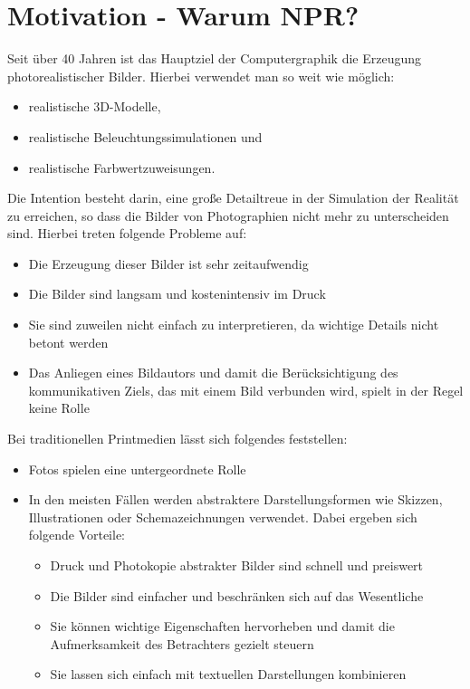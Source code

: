 \section{Motivation - Warum NPR?}
Seit über 40 Jahren ist das Hauptziel der Computergraphik die Erzeugung 
photorealistischer Bilder. Hierbei verwendet man so weit wie möglich:
\begin{itemize}
  \item realistische 3D-Modelle,
  \item realistische Beleuchtungssimulationen und
  \item realistische Farbwertzuweisungen.
\end{itemize}
Die Intention besteht darin, eine große Detailtreue in der Simulation der 
Realität zu erreichen, so dass die Bilder von Photographien nicht mehr zu 
unterscheiden sind. Hierbei treten folgende Probleme auf:
\begin{itemize}
  \item Die Erzeugung dieser Bilder ist sehr zeitaufwendig
  \item Die Bilder sind langsam und kostenintensiv im Druck
  \item Sie sind zuweilen nicht einfach zu interpretieren, da wichtige Details 
  nicht betont werden
  \item Das Anliegen eines Bildautors und damit die Berücksichtigung des 
  kommunikativen Ziels, das mit einem Bild verbunden wird, spielt in der Regel 
  keine Rolle
\end{itemize}
  Bei traditionellen Printmedien lässt sich folgendes feststellen:
\begin{itemize}
  \item Fotos spielen eine untergeordnete Rolle
  \item In den meisten Fällen werden abstraktere Darstellungsformen wie 
  Skizzen, Illustrationen oder Schemazeichnungen verwendet. Dabei ergeben sich 
  folgende Vorteile:
  \begin{itemize}
    \item Druck und Photokopie abstrakter Bilder sind schnell und preiswert
    \item Die Bilder sind einfacher und beschränken sich auf das Wesentliche
    \item Sie können wichtige Eigenschaften hervorheben und damit die 
    Aufmerksamkeit des Betrachters gezielt steuern
    \item Sie lassen sich einfach mit textuellen Darstellungen kombinieren
  \end{itemize}
\end{itemize}
